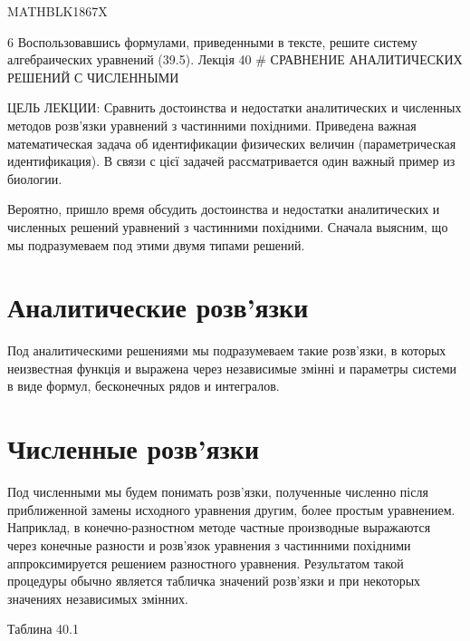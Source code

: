 \documentclass[
  ukrainian,
]{article}
\begin{document}
MATHBLK1867X

6 Воспользовавшись формулами, приведенными в тексте, решите систему
алгебраических уравнений (39.5). Лекція 40 \# СРАВНЕНИЕ АНАЛИТИЧЕСКИХ
РЕШЕНИЙ С ЧИСЛЕННЫМИ

ЦЕЛЬ ЛЕКЦИИ: Сравнить достоинства и недостатки аналитических и численных
методов розв'язки уравнений з частинними похідними. Приведена важная
математическая задача об идентификации физических величин
(параметрическая идентификация). В связи с цієї задачей рассматривается
один важный пример из биологии.

Вероятно, пришло время обсудить достоинства и недостатки аналитических и
численных решений уравнений з частинними похідними. Сначала выясним, що
мы подразумеваем под этими двумя типами решений.

\section{Аналитические
розв'язки}\label{ux430ux43dux430ux43bux438ux442ux438ux447ux435ux441ux43aux438ux435-ux440ux43eux437ux432ux44fux437ux43aux438}

Под аналитическими решениями мы подразумеваем такие розв'язки, в которых
неизвестная функція и выражена через независимые змінні и параметры
системи в виде формул, бесконечных рядов и интегралов.

\section{Численные
розв'язки}\label{ux447ux438ux441ux43bux435ux43dux43dux44bux435-ux440ux43eux437ux432ux44fux437ux43aux438}

Под численными мы будем понимать розв'язки, полученные численно після
приближенной замены исходного уравнения другим, более простым
уравнением. Наприклад, в конечно-разностном методе частные производные
выражаются через конечные разности и розв'язок уравнения з частинними
похідними аппроксимируется решением разностного уравнения. Результатом
такой процедуры обычно является табличка значений розв'язки и при
некоторых значениях независимых змінних.

Таблина 40.1
\end{document}
